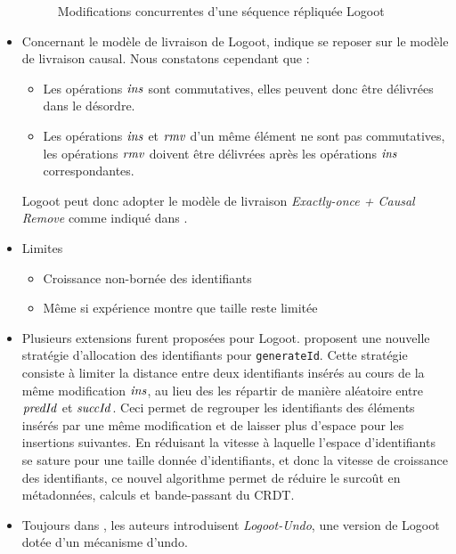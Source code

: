 \begin{itemize}
\begin{figure}[!ht]
{
      }
      \caption{Modifications concurrentes d'une séquence répliquée Logoot}
      \label{fig:logoot}
    \end{figure}
  \item Concernant le modèle de livraison de Logoot, \cite{2009-logoot-weiss} indique se reposer sur le modèle de livraison causal.
    Nous constatons cependant que :
    \begin{itemize}
      \item Les opérations $\mathit{ins}$ sont commutatives, elles peuvent donc être délivrées dans le désordre.
      \item Les opérations $\mathit{ins}$ et $\mathit{rmv}$ d'un même élément ne sont pas commutatives, les opérations $\mathit{rmv}$ doivent être délivrées après les opérations $\mathit{ins}$ correspondantes.
    \end{itemize}
    Logoot peut donc adopter le modèle de livraison \emph{Exactly-once + Causal Remove} comme indiqué dans \cite{2021-these-vic}.
  \item Limites
  \begin{itemize}
    \item Croissance non-bornée des identifiants
    \item Même si expérience montre que taille reste limitée
  \end{itemize}
  \item Plusieurs extensions furent proposées pour Logoot.
    \textcite{2010-logoot-undo-weiss} proposent une nouvelle stratégie d'allocation des identifiants pour \texttt{generateId}.
    Cette stratégie consiste à limiter la distance entre deux identifiants insérés au cours de la même modification $\mathit{ins}$, au lieu des les répartir de manière aléatoire entre $\mathit{predId}$ et $\mathit{succId}$.
    Ceci permet de regrouper les identifiants des éléments insérés par une même modification et de laisser plus d'espace pour les insertions suivantes.
    En réduisant la vitesse à laquelle l'espace d'identifiants se sature pour une taille donnée d'identifiants, et donc la vitesse de croissance des identifiants, ce nouvel algorithme permet de réduire le surcoût en métadonnées, calculs et bande-passant du \ac{CRDT}.
  \item Toujours dans \cite{2010-logoot-undo-weiss}, les auteurs introduisent \emph{Logoot-Undo}, une version de Logoot dotée d'un mécanisme d'undo.

\end{itemize}
